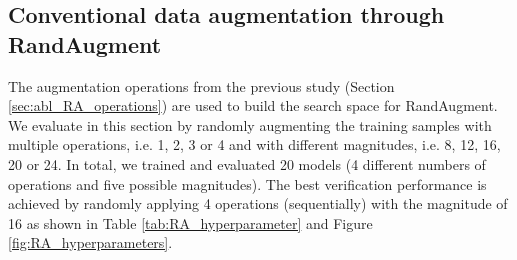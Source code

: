 \documentclass[10pt,twocolumn,letterpaper]{ieeeconf}
\begin{document}
\subsection{Conventional data augmentation through RandAugment}
\label{sec:abl_RA_N_M}
The augmentation operations from the previous study (Section \ref{sec:abl_RA_operations}) are used to build the search space for RandAugment. We evaluate in this section by randomly augmenting the training samples with multiple operations, i.e. 1, 2, 3 or 4 and with different magnitudes, i.e. 8, 12, 16, 20 or 24. In total, we trained and evaluated 20 models (4 different numbers of operations and five possible magnitudes). The best verification performance is achieved by randomly applying 4 operations (sequentially) with the magnitude of 16 as shown in Table \ref{tab:RA_hyperparameter} and Figure \ref{fig:RA_hyperparameters}.






\begin{table}[h!]
\caption{Verification accuracies (\%) achieved by models with different feature representation dimensionality on five FR benchmarks. The best overall verification accuracy is achieved by feature representation of 512-D.}
\label{tab:emb_size}
\vspace{-4mm}
\end{table}
\end{document}

